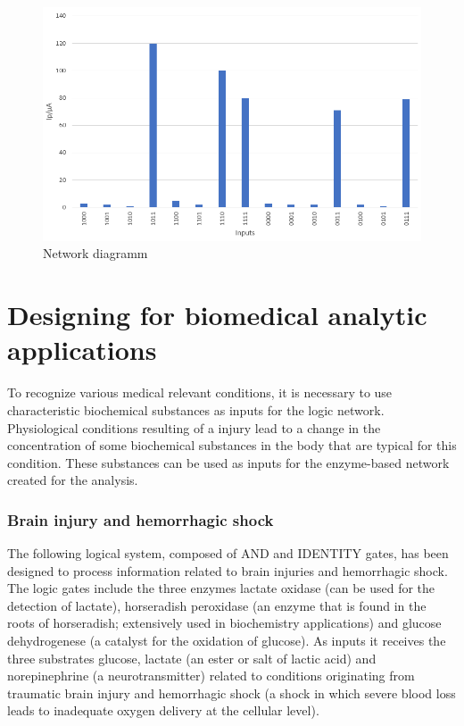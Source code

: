 \documentclass[runningheads]{llncs}
\begin{document}
		\begin{figure}[H] \centering \includegraphics[scale= 0.4]{pics/pH.png} \caption{Network diagramm} \label{img:ph} \end{figure}
	
	

\section{Designing for biomedical analytic applications}
	To recognize various medical relevant conditions, it is necessary to use characteristic biochemical substances as inputs for the logic network.
	Physiological conditions resulting of a injury lead to a change in the concentration of some biochemical substances in the body that are typical for this condition. These substances can be used as inputs for the enzyme-based network created for the analysis.
	
	
	\subsubsection{Brain injury and hemorrhagic shock}
	
	The following logical system, composed of AND and IDENTITY gates, has been designed to process information related to brain injuries and hemorrhagic shock.
	The logic gates include the three enzymes lactate oxidase (can be used for the detection of lactate), horseradish peroxidase (an enzyme that is found in the roots of horseradish; extensively used in biochemistry applications)\cite{horse} and glucose dehydrogenese (a catalyst for the oxidation of glucose)\cite{chemie}.
	As inputs it receives the three substrates glucose, lactate (an ester or salt of lactic acid) and norepinephrine (a neurotransmitter) related to conditions originating from traumatic brain injury and hemorrhagic shock (a shock in which severe blood loss leads to inadequate oxygen delivery at the cellular level)\cite{shock}.
	
\end{document}
